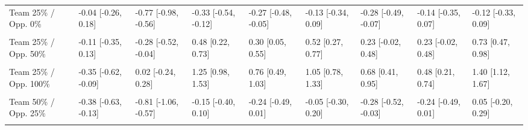\documentclass[]{elsarticle} %
\begin{document}
\begin{landscape}
\begin{table}
{\begin{tabular}[t]{lllllllll}
\addlinespace
Team 25\% / Opp. 0\% & -0.04 [-0.26, 0.18] & -0.77 [-0.98, -0.56] & -0.33 [-0.54, -0.12] & -0.27 [-0.48, -0.05] & -0.13 [-0.34, 0.09] & -0.28 [-0.49, -0.07] & -0.14 [-0.35, 0.07] & -0.12 [-0.33, 0.09]\\
\cellcolor{gray!6}{Team 25\% / Opp. 25\%} & \cellcolor{gray!6}{-0.09 [-0.31, 0.14]} & \cellcolor{gray!6}{-0.55 [-0.77, -0.32]} & \cellcolor{gray!6}{0.10 [-0.13, 0.33]} & \cellcolor{gray!6}{0.02 [-0.21, 0.25]} & \cellcolor{gray!6}{0.20 [-0.03, 0.43]} & \cellcolor{gray!6}{-0.01 [-0.24, 0.22]} & \cellcolor{gray!6}{0.03 [-0.19, 0.26]} & \cellcolor{gray!6}{0.30 [0.07, 0.53]}\\
Team 25\% / Opp. 50\% & -0.11 [-0.35, 0.13] & -0.28 [-0.52, -0.04] & 0.48 [0.22, 0.73] & 0.30 [0.05, 0.55] & 0.52 [0.27, 0.77] & 0.23 [-0.02, 0.48] & 0.23 [-0.02, 0.48] & 0.73 [0.47, 0.98]\\
\cellcolor{gray!6}{Team 25\% / Opp. 75\%} & \cellcolor{gray!6}{-0.22 [-0.47, 0.03]} & \cellcolor{gray!6}{-0.13 [-0.38, 0.12]} & \cellcolor{gray!6}{0.87 [0.61, 1.13]} & \cellcolor{gray!6}{0.51 [0.26, 0.77]} & \cellcolor{gray!6}{0.79 [0.53, 1.05]} & \cellcolor{gray!6}{0.49 [0.23, 0.74]} & \cellcolor{gray!6}{0.42 [0.17, 0.67]} & \cellcolor{gray!6}{1.13 [0.87, 1.39]}\\
Team 25\% / Opp. 100\% & -0.35 [-0.62, -0.09] & 0.02 [-0.24, 0.28] & 1.25 [0.98, 1.53] & 0.76 [0.49, 1.03] & 1.05 [0.78, 1.33] & 0.68 [0.41, 0.95] & 0.48 [0.21, 0.74] & 1.40 [1.12, 1.67]\\
\addlinespace
\cellcolor{gray!6}{Team 50\% / Opp. 0\%} & \cellcolor{gray!6}{-0.34 [-0.58, -0.10]} & \cellcolor{gray!6}{-1.04 [-1.27, -0.80]} & \cellcolor{gray!6}{-0.57 [-0.81, -0.34]} & \cellcolor{gray!6}{-0.52 [-0.75, -0.29]} & \cellcolor{gray!6}{-0.37 [-0.60, -0.14]} & \cellcolor{gray!6}{-0.54 [-0.77, -0.31]} & \cellcolor{gray!6}{-0.42 [-0.65, -0.19]} & \cellcolor{gray!6}{-0.37 [-0.60, -0.15]}\\
Team 50\% / Opp. 25\% & -0.38 [-0.63, -0.13] & -0.81 [-1.06, -0.57] & -0.15 [-0.40, 0.10] & -0.24 [-0.49, 0.01] & -0.05 [-0.30, 0.20] & -0.28 [-0.52, -0.03] & -0.24 [-0.49, 0.01] & 0.05 [-0.20, 0.29]\\
\cellcolor{gray!6}{Team 50\% / Opp. 50\%} & \cellcolor{gray!6}{-0.40 [-0.67, -0.14]} & \cellcolor{gray!6}{-0.54 [-0.81, -0.28]} & \cellcolor{gray!6}{0.23 [-0.04, 0.50]} & \cellcolor{gray!6}{0.05 [-0.22, 0.31]} & \cellcolor{gray!6}{0.27 [0.00, 0.54]} & \cellcolor{gray!6}{-0.03 [-0.30, 0.23]} & \cellcolor{gray!6}{-0.05 [-0.31, 0.22]} & \cellcolor{gray!6}{0.48 [0.21, 0.75]}\\

\end{tabular}}
\end{table}
\end{landscape}
\end{document}
